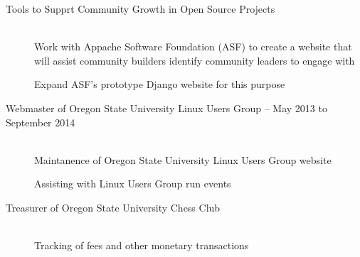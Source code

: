 \documentclass[11pt]{article}
\begin{document}
\smallskip
\hrulefill
\bigskip

\begin{description}
  \item [Tools to Supprt Community Growth in Open Source Projects]
    \hfill \\
    Work with Appache Software Foundation (ASF) to create a website that will
    assist community builders identify community leaders to engage with

    Expand ASF's prototype Django website for this purpose
\end{description}

\smallskip
\hrulefill
\bigskip

\begin{description}
     \item[Webmaster of Oregon State University Linux Users Group -- May 2013 to September 2014]
        \hfill \\
        Maintanence of Oregon State University Linux Users Group website

        Assisting with Linux Users Group run events

   \item[Treasurer of Oregon State University Chess Club]
        \hfill \\ 
        Tracking of fees and other monetary transactions
\end{description}
\end{document}
